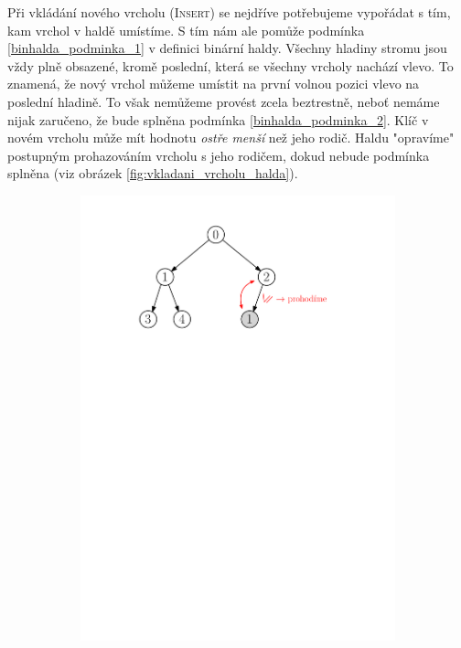 Při vkládání nového vrcholu (\textsc{Insert}) se nejdříve potřebujeme vypořádat s tím, kam vrchol v haldě umístíme. S tím nám ale pomůže podmínka \ref{binhalda_podminka_1} v definici binární haldy. Všechny hladiny stromu jsou vždy plně obsazené, kromě poslední, která se všechny vrcholy nachází vlevo. To znamená, že nový vrchol můžeme umístit na první volnou pozici vlevo na poslední hladině. To však nemůžeme provést zcela beztrestně, neboť nemáme nijak zaručeno, že bude splněna podmínka \ref{binhalda_podminka_2}. Klíč v novém vrcholu může mít hodnotu \emph{ostře menší} než jeho rodič. Haldu "opravíme" postupným prohazováním vrcholu s jeho rodičem, dokud nebude podmínka splněna (viz obrázek \ref{fig:vkladani_vrcholu_halda}).
\begin{figure}[h]
    \centering
    \begin{subfigure}{7cm}
        \includegraphics[scale=.5]{01-grafalgo/images/ch01_vkladani_1}

\end{subfigure}
\end{figure}
